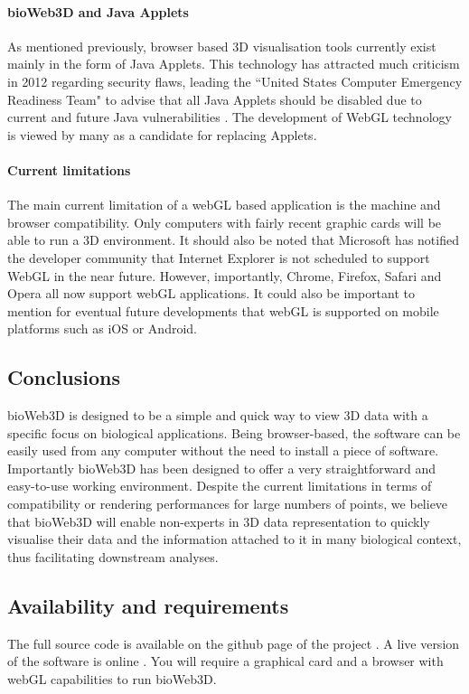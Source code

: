 		\paragraph{bioWeb3D and Java Applets}
As mentioned previously, browser based 3D visualisation tools currently exist mainly in the form of Java Applets. This technology has attracted much criticism in 2012 regarding security flaws, leading the ``United States Computer Emergency Readiness Team" to advise that all Java Applets should be disabled due to current and future Java vulnerabilities \cite{security}. The development of WebGL technology is viewed by many as a candidate for replacing Applets. 



		\paragraph{Current limitations}
The main current limitation of a webGL based application is the machine and browser compatibility. Only computers with fairly recent graphic cards will be able to run a 3D environment. It should also be noted that Microsoft has notified the developer community that Internet Explorer is not scheduled to support WebGL in the near future. However, importantly, Chrome, Firefox, Safari and Opera all now support webGL applications. It could also be important to mention for eventual future developments that webGL is supported on mobile platforms such as iOS or Android. \cite{caniuse}

	\subsection{Conclusions}
bioWeb3D is designed to be a simple and quick way to view 3D data with a specific focus on biological applications.  Being browser-based, the software can be easily used from any computer without the need to install a piece of software. Importantly bioWeb3D has been designed to offer a very straightforward and easy-to-use working environment. Despite the current limitations in terms of compatibility or rendering performances for large numbers of points, we believe that bioWeb3D will enable non-experts in 3D data representation to quickly visualise their data and the information attached to it in many biological context, thus facilitating downstream analyses.

	\subsection{Availability and requirements}
The full source code is available on the github page of the project \cite{github}. A live version of the software is online \cite{bioWeb3D}. You will require a graphical card and a browser with webGL capabilities to run bioWeb3D.

